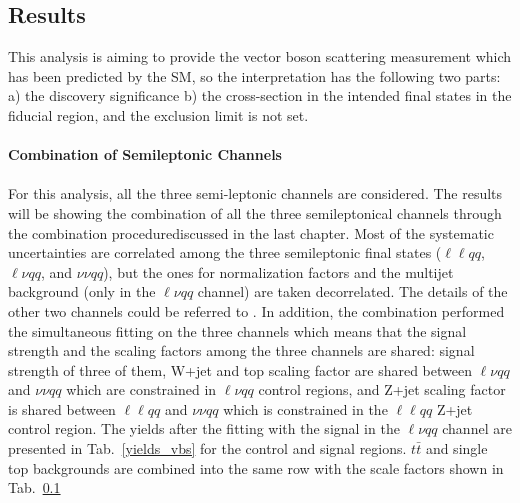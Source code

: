 \subsection{Results}
This analysis is aiming to provide the vector boson scattering measurement which has been predicted by the SM, so the interpretation has the following two parts: a) the discovery significance b) the cross-section in the intended final states in the fiducial region, and the exclusion limit is not set. 
\\
\\{\bf Combination of Semileptonic Channels}
\\
\\For this analysis, all the three semi-leptonic channels are considered. The results will be showing the combination of all the three semileptonical channels through the combination procedurediscussed in the last chapter. Most of the systematic uncertainties are correlated among the three semileptonic final states ($\ell\ell qq$, $\ell\nu qq$, and $\nu\nu qq$), but the ones for normalization factors and the multijet background (only in the $\ell\nu qq$ channel) are taken decorrelated. The details of the other two channels could be referred to \cite{Aad:2019xxo}. In addition, the combination performed the simultaneous fitting on the three channels which means that the signal strength and the scaling factors among the three channels are shared: signal strength of three of them, W+jet and top scaling factor are shared between $\ell\nu qq$ and $\nu\nu qq$ which are constrained in $\ell\nu qq$ control regions, and Z+jet scaling factor is shared between $\ell\ell qq$ and $\nu\nu qq$ which is constrained in the $\ell\ell qq$ Z+jet control region. The yields after the fitting with the signal in the $\ell\nu qq$ channel are presented in Tab.~\ref{yields_vbs} for the control and signal regions. $t\bar{t}$ and single top backgrounds are combined into the same row with the scale factors shown in Tab.~\ref{}

